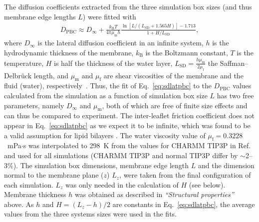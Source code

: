 \documentclass[journal=jctcce]{achemso}
\begin{document}
The diffusion coefficients extracted from the three simulation box sizes (and thus membrane edge lengths $L$) were fitted with
%
\begin{align}
	D_\mathrm{PBC}\approx D_\infty+\frac{k_\mathrm{B}T}{4\pi\mu_\mathrm{m}h}\frac{\ln\left[L/\left(L_\mathrm{SD}+1.565H\right)\right]-1.713}{1+H/L_\mathrm{SD}},
	\label{eq:sdlatpbc}
\end{align}
%
where $D_\infty$ is the lateral diffusion coefficient in an infinite system, $h$ is the hydrodynamic thickness of the membrane, $k_\mathrm{B}$ is the Boltzmann constant, $T$ is the temperature, $H$ is half the thickness of the water layer, $L_\mathrm{SD}=\frac{h\mu_\mathrm{m}}{2\mu_\mathrm{f}}$ the Saffman--Delbr\"{u}ck length, and $\mu_\mathrm{m}$ and $\mu_\mathrm{f}$ are shear viscosities of the membrane and the fluid (water), respectively~\cite{vogele2018hydrodynamics}. Thus, the fit of Eq.~\eqref{eq:sdlatpbc} to the $D_\mathrm{PBC}$ values calculated from the simulation as a function of simulation box size $L$ has two free parameters, namely $D_\infty$ and $\mu_\mathrm{m}$, both of which are free of finite size effects and can thus be compared to experiment. The inter-leaflet friction coefficient does not appear in Eq.~\eqref{eq:sdlatpbc} as we expect it to be infinite, which was found to be a valid assumption for lipid bilayers \cite{vogele2018hydrodynamics}. The water viscosity value of $\mu_\mathrm{f}= 0.3228$~mPa$\cdot$s was interpolated to 298~K from the values for CHARMM TIP3P in Ref.~ and used for all simulations (CHARMM TIP3P and normal TIP3P differ by $\sim$2--3\%). The simulation box dimensions, membrane edge length $L$ and the dimension normal to the membrane plane ($z$) $L_z$, were taken from the final configuration of each simulation. $L_z$ was only needed in the calculation of $H$ (see below). Membrane thickness $h$ was obtained as described in \textit{``Structural properties''} above. As $h$ and $H=(L_z-h)/2$ are constants in Eq.~\eqref{eq:sdlatpbc}, the average values from the three systems sizes were used in the fits. 
\end{document}

